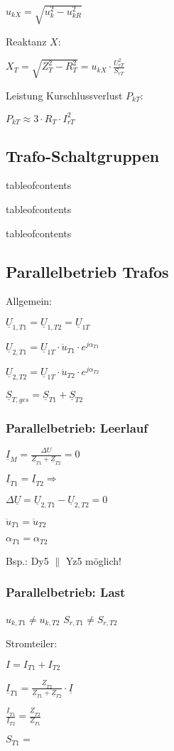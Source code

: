 \documentclass[a4paper,11pt]{article}
\begin{document}
	$u_{kX} = \sqrt{u^2_k - u^2_{kR}}$

	Reaktanz $X$:

	$X_T = \sqrt{Z^2_T - R^2_T} = u_{kX} \cdot \frac{U^2_{rT}}{S_{rT}}$

	Leistung Kurschlussverlust $P_{kT}$:

	$P_{kT} \approx 3\cdot R_T \cdot I^2_{rT}$

	\subsection{Trafo-Schaltgruppen}
	tableofcontents


	tableofcontents


	tableofcontents

	\subsection{Parallelbetrieb Trafos}
	Allgemein:

	$\underline{U}_{1,T1} = \underline{U}_{1,T2} = \underline{U}_{1T}$

	$\underline{U}_{2,T1} = \underline{U}_{1T} \cdot \ddot{u}_{T1} \cdot e^{j\alpha_{T1}}$

	$\underline{U}_{2,T2} = \underline{U}_{1T} \cdot \ddot{u}_{T2} \cdot e^{j\alpha_{T2}}$

	$\underline{S}_{T,ges} = \underline{S}_{T1} + \underline{S}_{T2}$

	\subsubsection{Parallelbetrieb: Leerlauf}

	$\underline{I}_M = \frac{\Delta \underline{U}}{\underline{Z}_{T1} + \underline{Z}_{T2}} = 0$

	$\underline{I}_{T1} = \underline{I}_{T2} \Rightarrow$

	$ \Delta \underline{U} = \underline{U}_{2,T1} - \underline{U}_{2,T2} = 0 $

	$\ddot{u}_{T1} = \ddot{u}_{T2}$

	$\alpha_{T1} = \alpha_{T2}$

	Bsp.: Dy5 $\parallel$ Yz5 möglich!

	\subsubsection{Parallelbetrieb: Last}

	$u_{k,T1} \neq u_{k,T2}$ \quad $S_{r,T1} \neq S_{r,T2}$

	Stromteiler:

	$I = I_{T1} + I_{T2}$

	$\underline{I}_{T1} = \frac{\underline{Z}_{T2}}{\underline{Z}_{T1}+\underline{Z}_{T2}}\cdot \underline{I}$

	$\frac{\underline{I}_{T1}}{\underline{I}_{T2}} = \frac{\underline{Z}_{T2}}{\underline{Z}_{T1}}$

	$S_{T1} = $

\end{document}
